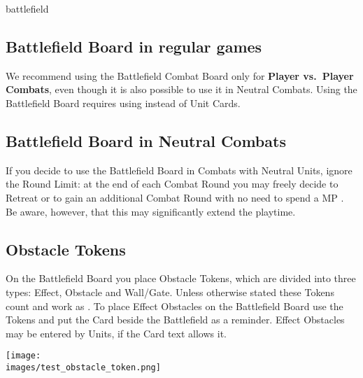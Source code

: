 \begin{expansion}{battlefield}
  \begin{multicols*}{2}
  \subsection*{Battlefield Board in regular games}
  We recommend using the Battlefield Combat Board only for \textbf{Player vs.~Player Combats}, even though it is also possible to use it in Neutral Combats.
  Using the Battlefield Board requires using  instead of Unit Cards.

  \medskip
  \subsection*{Battlefield Board in Neutral Combats}
  If you decide to use the Battlefield Board in Combats with Neutral Units, ignore the Round Limit:
  at the end of each Combat Round you may freely decide to Retreat or to gain an additional Combat Round with no need to spend a MP .
  Be aware, however, that this may significantly extend the playtime.

  \medskip
  \subsection*{Obstacle Tokens}
  On the Battlefield Board you place Obstacle Tokens, which are divided into three types:
  Effect, Obstacle and Wall/Gate.
  Unless otherwise stated these Tokens count and work as .
  To place Effect Obstacles on the Battlefield Board use the Tokens and put the Card beside the Battlefield as a reminder.
  Effect Obstacles may be entered by Units, if the Card text allows it.
  \vspace*{1em}
  \begin{center}
  \texttt{[image: \\images/test\_obstacle\_token.png]}
  \end{center}
  \vspace*{1em}
  \columnbreak


\end{multicols*}
\end{expansion}

